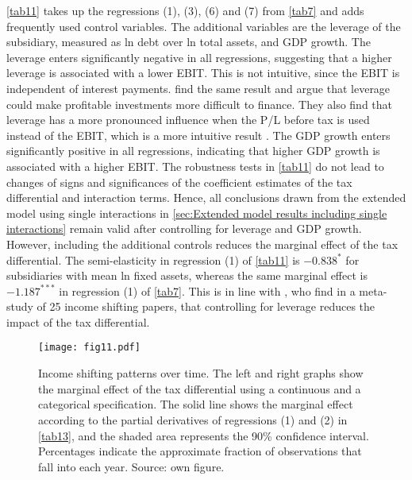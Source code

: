 \documentclass[10pt,twocolumn,oneside,cmyk]{article}
\begin{document}
\cref{tab11} takes up the regressions (1), (3), (6) and (7) from \cref{tab7} and adds frequently used control variables. The additional variables are the leverage of the subsidiary, measured as ln debt over ln total assets, and GDP growth. The leverage enters significantly negative in all regressions, suggesting that a higher leverage is associated with a lower EBIT. This is not intuitive, since the EBIT is independent of interest payments. \textcite[1174]{huizinga_international_2008} find the same result and argue that leverage could make profitable investments more difficult to finance. They also find that leverage has a more pronounced influence when the P/L before tax is used instead of the EBIT, which is a more intuitive result \parencite[1174]{huizinga_international_2008}. The GDP growth enters significantly positive in all regressions, indicating that higher GDP growth is associated with a higher EBIT. The robustness tests in \cref{tab11} do not lead to changes of signs and significances of the coefficient estimates of the tax differential and interaction terms. Hence, all conclusions drawn from the extended model using single interactions in \cref{sec:Extended model results including single interactions} remain valid after controlling for leverage and GDP growth. However, including the additional controls reduces the marginal effect of the tax differential. The semi-elasticity in regression (1) of \cref{tab11} is $-0.838^*$ for subsidiaries with mean ln fixed assets, whereas the same marginal effect is $-1.187^{***}$ in regression (1) of \cref{tab7}. This is in line with \textcite[18]{heckemeyer_multinationals_2013}, who find in a meta-study of 25 income shifting papers, that controlling for leverage reduces the impact of the tax differential.

\begin{figure*}[t]
 \centering \captionsetup{width=0.95\textwidth}
   \texttt{[image: fig11.pdf]}
 \caption[Income shifting patterns over time]{Income shifting patterns over time. The left and right graphs show the marginal effect of the tax differential using a continuous and a categorical specification. The solid line shows the marginal effect according to the partial derivatives of regressions (1) and (2) in \cref{tab13}, and the shaded area represents the 90\% confidence interval. Percentages indicate the approximate fraction of observations that fall into each year. Source: own figure.}\label{fig11}
\end{figure*}
\end{document}
